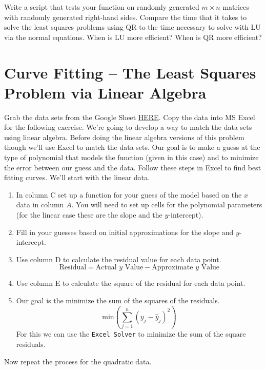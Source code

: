 \begin{problem}
    Write a script that tests your  function on randomly generated $m\times n$ matrices
    with randomly generated right-hand sides. Compare the time that it takes to solve the
    least squares problems using QR to the time necessary to solve with LU via the normal
    equations. When is LU more efficient? When is QR more efficient?
\end{problem}

\newpage\section{Curve Fitting -- The Least Squares Problem via Linear Algebra}\label{sec:least_squares}
\begin{problem}\label{prob:least_squares_1}
    Grab the data sets from the Google Sheet
    \href{https://docs.google.com/spreadsheets/d/1bpqb51eTTtJbe9V1JLt_JkzN-8kbIh2RzisRQHIMLrY/edit?usp=sharing}{HERE}.
    Copy the data into MS Excel for the following exercise.  We're going to develop a way
    to match the data sets using linear algebra.  Before doing the linear algebra versions
    of this problem though we'll use Excel to match the data sets.  Our goal is to make a
    guess at the type of polynomial that models the function (given in this case) and to
    minimize the error between our guess and the data.  Follow these steps in Excel to
    find best fitting curves.  We'll start with the linear data.
    \begin{enumerate}
        \item In column C set up a function for your guess of the model based on the $x$ data in column
            $A$.  You will need to set up cells for the polynomial parameters (for the
            linear case these are the slope and the $y$-intercept).
        \item Fill in your guesses based on initial approximations for the slope and
            $y$-intercept.
        \item Use column D to calculate the residual value for each data point.
            \[ \text{Residual} = \text{Actual $y$ Value} - \text{Approximate $y$ Value} \]
        \item Use column E to calculate the square of the residual for each data point.
        \item Our goal is the minimize the sum of the squares of the residuals.
            \[ \text{min} \left( \sum_{j=1}^n \left( y_j - \hat{y}_j \right)^2 \right) \]
            For this we can use the \texttt{Excel Solver} to minimize the sum of the
            square residuals.
    \end{enumerate}
    Now repeat the process for the quadratic data.
\end{problem}




